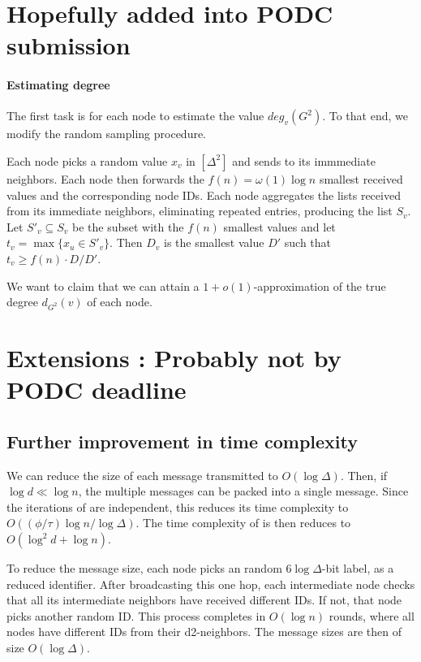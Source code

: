 \section{Hopefully added into PODC submission}


\paragraph{Estimating degree} The first task is for each node to estimate the value $deg_v(G^2)$. To that end, we modify the random sampling procedure.

Each node picks a random value $x_v$ in $[\Delta^2]$ and sends to its immmediate neighbors. Each node then forwards the $f(n) = \omega(1) \log n$ smallest received values and the corresponding node IDs. Each node aggregates the lists received from its immediate neighbors, eliminating repeated entries, producing the list $S_v$.
Let $S'_v \subseteq S_v$ be the subset with the $f(n)$ smallest values and let $t_v = \max \{x_u \in S'_v\}$. 
Then $D_v$ is the smallest value $D'$ such that $t_v \ge f(n) \cdot D / D'$.

We want to claim that we can attain a $1+o(1)$-approximation of the true degree $d_{G^2}(v)$ of each node.

\section{Extensions : Probably not by PODC deadline}
% 

\subsection{Further improvement in time complexity}

We can reduce the size of each message transmitted to $O(\log \Delta)$. Then, if $\log d \ll \log n$, the multiple messages can be packed into a single {\congest} message. Since the iterations of  are independent, this reduces its time complexity to $O((\phi/\tau)\log n / \log \Delta)$. The time complexity of  is then reduces to $O(\log^2 d + \log n)$. 

To reduce the message size, each node picks an random $6\log \Delta$-bit label, as a reduced identifier. After broadcasting this one hop, each intermediate node checks that all its intermediate neighbors have received different IDs. If not, that node picks another random ID. This process completes in $O(\log n)$ rounds, where all nodes have different IDs from their d2-neighbors. The message sizes are then of size $O(\log \Delta)$.

